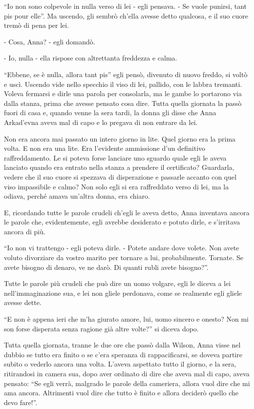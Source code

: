 ``Io non sono colpevole in nulla verso di lei - egli pensava. - Se vuole punirsi, tant pis pour elle''. Ma uscendo, gli sembrò ch'ella avesse detto qualcosa, e il suo cuore tremò di pena per lei. 

- Cosa, Anna? - egli domandò. 

- Io, nulla - ella rispose con altrettanta freddezza e calma. 

``Ebbene, se è nulla, allora tant pis'' egli pensò, divenuto di nuovo freddo, si voltò e uscì. Uscendo vide nello specchio il viso di lei, pallido, con le labbra tremanti. Voleva fermarsi e dirle una parola per consolarla, ma le gambe lo portarono via dalla stanza, prima che avesse pensato cosa dire. Tutta quella giornata la passò fuori di casa e, quando venne la sera tardi, la donna gli disse che Anna Arkad'evna aveva mal di capo e lo pregava di non entrare da lei. 

Non era ancora mai passato un intero giorno in lite. Quel giorno era la prima volta. E non era una lite. Era l'evidente ammissione d'un definitivo raffreddamento. Le si poteva forse lanciare uno sguardo quale egli le aveva lanciato quando era entrato nella stanza a prendere il certificato? Guardarla, vedere che il suo cuore si spezzava di disperazione e passarle accanto con quel viso impassibile e calmo? Non solo egli si era raffreddato verso di lei, ma la odiava, perché amava un'altra donna, era chiaro. 

E, ricordando tutte le parole crudeli ch'egli le aveva detto, Anna inventava ancora le parole che, evidentemente, egli avrebbe desiderato e potuto dirle, e s'irritava ancora di più. 

``Io non vi trattengo - egli poteva dirle. - Potete andare dove volete. Non avete voluto divorziare da vostro marito per tornare a lui, probabilmente. Tornate. Se avete bisogno di denaro, ve ne darò. Di quanti rubli avete bisogno?''. 

Tutte le parole più crudeli che può dire un uomo volgare, egli le diceva a lei nell'immaginazione sua, e lei non gliele perdonava, come se realmente egli gliele avesse dette. 

``E non è appena ieri che m'ha giurato amore, lui, uomo sincero e onesto? Non mi son forse disperata senza ragione già altre volte?'' si diceva dopo. 

Tutta quella giornata, tranne le due ore che passò dalla Wilson, Anna visse nel dubbio se tutto era finito o se c'era speranza di rappacificarsi, se doveva partire subito o vederlo ancora una volta. L'aveva aspettato tutto il giorno, e la sera, ritirandosi in camera sua, dopo aver ordinato di dire che aveva mal di capo, aveva pensato: ``Se egli verrà, malgrado le parole della cameriera, allora vuol dire che mi ama ancora. Altrimenti vuol dire che tutto è finito e allora deciderò quello che devo fare!''. 

